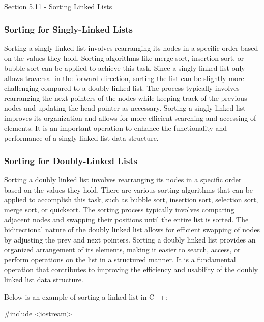 \begin{notes}{Section 5.11 - Sorting Linked Lists}
    \subsubsection*{Sorting for Singly-Linked Lists}

    Sorting a singly linked list involves rearranging its nodes in a specific order based on the values they hold. Sorting algorithms like merge sort, insertion sort, or bubble sort can be applied to achieve this task. Since a singly linked list only allows traversal in the forward direction, sorting the list can be slightly more challenging 
    compared to a doubly linked list. The process typically involves rearranging the next pointers of the nodes while keeping track of the previous nodes and updating the head pointer as necessary. Sorting a singly linked list improves its organization and allows for more efficient searching and accessing of elements. It is an important operation 
    to enhance the functionality and performance of a singly linked list data structure.
    
    \subsubsection*{Sorting for Doubly-Linked Lists}
    
    Sorting a doubly linked list involves rearranging its nodes in a specific order based on the values they hold. There are various sorting algorithms that can be applied to accomplish this task, such as bubble sort, insertion sort, selection sort, merge sort, or quicksort. The sorting process typically involves comparing adjacent nodes 
    and swapping their positions until the entire list is sorted. The bidirectional nature of the doubly linked list allows for efficient swapping of nodes by adjusting the prev and next pointers. Sorting a doubly linked list provides an organized arrangement of its elements, making it easier to search, access, or perform operations on 
    the list in a structured manner. It is a fundamental operation that contributes to improving the efficiency and usability of the doubly linked list data structure.
    
    \begin{highlight}
        Below is an example of sorting a linked list in C++:
    
    \begin{code}[C++]
    #include <iostream>
    

\end{code}
\end{highlight}
\end{notes}
